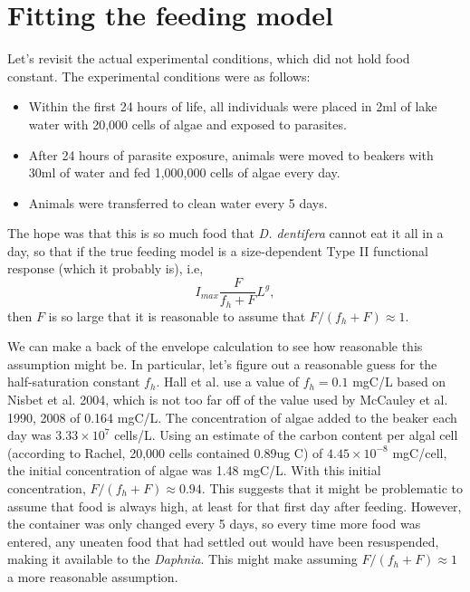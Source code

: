 \documentclass[12pt,reqno,final,pdftex]{amsart}\usepackage[]{graphicx}\usepackage[]{color}
\theoremstyle{plain}
\numberwithin{equation}{part}
\begin{document}
\section*{Fitting the feeding model}
Let's revisit the actual experimental conditions, which did not hold food constant.
The experimental conditions were as follows:
\begin{itemize}
\item Within the first 24 hours of life, all individuals were placed in 2ml of lake water with 20,000 cells of algae and exposed to parasites.
\item After 24 hours of parasite exposure, animals were moved to beakers with 30ml of water and fed 1,000,000 cells of algae every day.
\item Animals were transferred to clean water every 5 days.
\end{itemize}
The hope was that this is so much food that \emph{D. dentifera} cannot eat it all in a day, so that if the true feeding model is a size-dependent Type II functional response (which it probably is), i.e,
\begin{equation}
I_{max} \frac{F}{f_h+F} L^g,
\end{equation}
then $F$ is so large that it is reasonable to assume that $F/(f_h+F) \approx 1$.

We can make a back of the envelope calculation to see how reasonable this assumption might be.
In particular, let's figure out a reasonable guess for the half-saturation constant $f_h$.
Hall et al. use a value of $f_h = 0.1$ mgC/L based on Nisbet et al. 2004, which is not too far off of the value used by McCauley et al. 1990, 2008 of 0.164 mgC/L.
The concentration of algae added to the beaker each day was $3.33 \times 10^7$ cells/L.
Using an estimate of the carbon content per algal cell (according to Rachel, 20,000 cells contained 0.89ug C) of $4.45 \times 10^{-8}$ mgC/cell, the initial concentration of algae was 1.48 mgC/L.
With this initial concentration, $F/(f_h + F) \approx 0.94$.
This suggests that it might be problematic to assume that food is always high, at least for that first day after feeding.
However, the container was only changed every 5 days, so every time more food was entered, any uneaten food that had settled out would have been resuspended, making it available to the \emph{Daphnia}.
This might make assuming $F/(f_h+F)\approx 1$ a more reasonable assumption.
\end{document}
